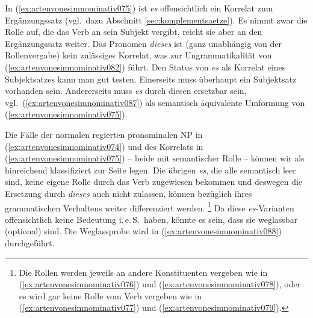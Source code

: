 In (\ref{ex:artenvonesimnominativ075}) ist \textit{es} offensichtlich ein Korrelat zum Ergänzungssatz (vgl.\ dazu Abschnitt \ref{sec:komplementsaetze}).
Es nimmt zwar die Rolle auf, die das Verb an sein Subjekt vergibt, reicht sie aber an den Ergänzungssatz weiter.
Das Pronomen \textit{dieses} ist (ganz unabhängig von der Rollenvergabe) kein zulässiges Korrelat, was zur Ungrammatikalität von (\ref{ex:artenvonesimnominativ082}) führt.
Den Status von \textit{es} als Korrelat eines Subjektsatzes kann man gut testen.
Einerseits muss überhaupt ein Subjektsatz vorhanden sein.
Andererseits muss \textit{es} durch diesen ersetzbar sein, vgl.\ (\ref{ex:artenvonesimnominativ087}) als semantisch äquivalente Umformung von (\ref{ex:artenvonesimnominativ075}).


\begin{exe}
\end{exe}


Die Fälle der normalen regierten pronominalen NP in (\ref{ex:artenvonesimnominativ074}) und des Korrelats in (\ref{ex:artenvonesimnominativ075}) -- beide mit semantischer Rolle -- können wir als hinreichend klassifiziert zur Seite legen.
Die übrigen \textit{es}, die alle semantisch leer sind, keine eigene Rolle durch das Verb zugewiesen bekommen und deswegen die Ersetzung durch \textit{dieses} auch nicht zulassen, können bezüglich ihres grammatischen Verhaltens weiter differenziert werden.%
\footnote{Die Rollen werden jeweils an andere Konstituenten vergeben wie in (\ref{ex:artenvonesimnominativ076}) und (\ref{ex:artenvonesimnominativ078}), oder es wird gar keine Rolle vom Verb vergeben wie in (\ref{ex:artenvonesimnominativ077}) und (\ref{ex:artenvonesimnominativ079}).}
Da diese \textit{es}-Varianten offensichtlich keine Bedeutung i.\,e.\,S.\ haben, könnte es \zB sein, dass sie weglassbar (optional) sind.
Die Weglassprobe wird in (\ref{ex:artenvonesimnominativ088}) durchgeführt.


\begin{exe}
  \ex\label{ex:artenvonesimnominativ088}
  \begin{xlist}
  \end{xlist}
\end{exe}


